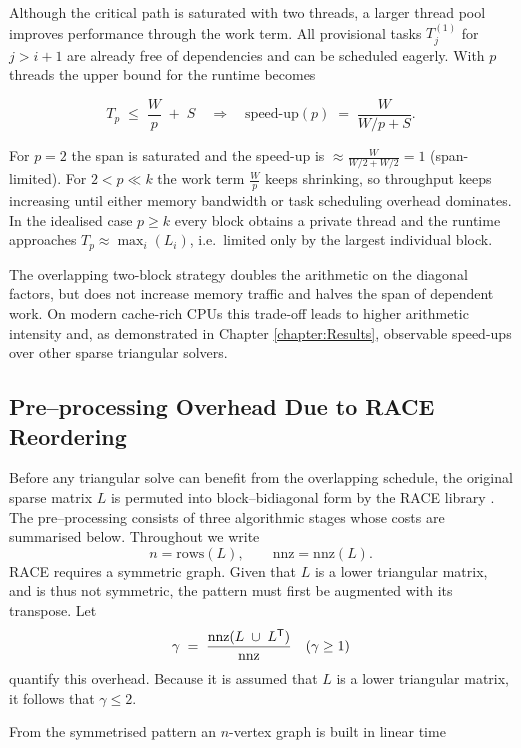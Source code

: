 Although the critical path is saturated with two threads, a larger
thread pool improves performance through the work term.  All
provisional tasks $T^{(1)}_{j}$ for $j> i+1$ are already free of
dependencies and can be scheduled eagerly.  With $p$ threads the
upper bound for the runtime becomes  

$$
  T_p \;\le\; \frac{W}{p} \;+\; S
  \quad\Longrightarrow\quad
  \text{speed-up}(p)\;=\;
  \frac{W}{W/p+S}.
$$

For $p = 2$ the span is saturated and the speed-up is $ \approx  \tfrac{W}{W/2+W/2}=1 $  (span-limited).
For $2 < p \ll k$ the work term $\tfrac{W}{p}$ keeps shrinking, so throughput keeps increasing until either memory bandwidth or task
  scheduling overhead dominates.
In the idealised case $p\ge k$ every block obtains a private thread and the runtime approaches $T_p\approx \max_i{(L_i)}$, i.e.\ limited
only by the largest individual block.

The overlapping two-block strategy doubles the arithmetic on the
diagonal factors, but does not increase memory traffic
and halves the span of dependent work.
On modern cache-rich CPUs this trade-off leads to higher
arithmetic intensity and, as demonstrated in
Chapter \ref{chapter:Results}, observable speed-ups over
other sparse triangular solvers.

\subsection{Pre–processing Overhead Due to RACE Reordering}
\label{sec:meth_cost_race}

Before any triangular solve can benefit from the overlapping schedule,
the original sparse matrix $L$ is permuted into block–bidiagonal
form by the RACE library \cite{10.1145/3399732}.  
The pre–processing consists of three algorithmic stages whose costs
are summarised below.  Throughout we write  
$$
  n=\mathrm{rows}(L), 
  \qquad
  \mathrm{nnz}=\mathrm{nnz}(L) .
$$
RACE requires a symmetric graph.
Given that $L$ is a lower triangular matrix, and is thus not symmetric, the pattern must first be augmented with its
transpose.  Let  
$$
  \gamma \;=\; 
  \frac{\mathrm{nnz}(L \;\cup\; L^{\sf T})}{\mathrm{nnz}}
  \quad (\gamma \ge 1)
$$
quantify this overhead. Because it is assumed that $L$ is a lower triangular matrix, it follows that $\gamma \leq 2$. 

From the symmetrised pattern an
$n$-vertex graph is built in linear time  

